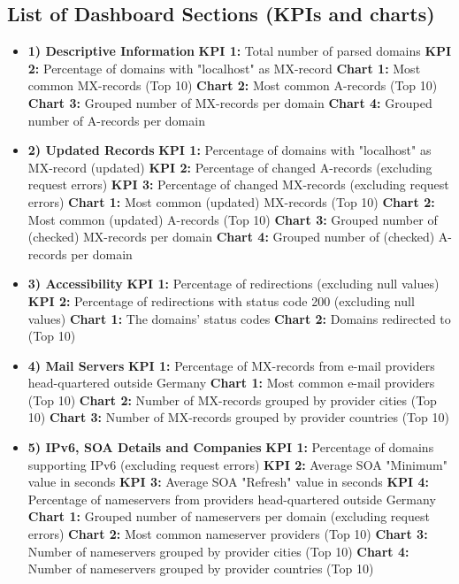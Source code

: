 \subsection{List of Dashboard Sections (KPIs and charts)}\label{subsec:dashboard-sections-(kpis-and-charts)}

\begin{itemize}
    \item \textbf{1) Descriptive Information}
    \subitem \textbf{KPI 1:} Total number of parsed domains
    \subitem \textbf{KPI 2:} Percentage of domains with "localhost" as MX-record
    \subitem \textbf{Chart 1:} Most common MX-records (Top 10)
    \subitem \textbf{Chart 2:} Most common A-records (Top 10)
    \subitem \textbf{Chart 3:} Grouped number of MX-records per domain
    \subitem \textbf{Chart 4:} Grouped number of A-records per domain

    \item \textbf{2) Updated Records}
    \subitem \textbf{KPI 1:} Percentage of domains with "localhost" as MX-record (updated)
    \subitem \textbf{KPI 2:} Percentage of changed A-records (excluding request errors)
    \subitem \textbf{KPI 3:} Percentage of changed MX-records (excluding request errors)
    \subitem \textbf{Chart 1:} Most common (updated) MX-records (Top 10)
    \subitem \textbf{Chart 2:} Most common (updated) A-records (Top 10)
    \subitem \textbf{Chart 3:} Grouped number of (checked) MX-records per domain
    \subitem \textbf{Chart 4:} Grouped number of (checked) A-records per domain

    \item \textbf{3) Accessibility}
    \subitem \textbf{KPI 1:} Percentage of redirections (excluding null values)
    \subitem \textbf{KPI 2:} Percentage of redirections with status code 200 (excluding null values)
    \subitem \textbf{Chart 1:} The domains' status codes
    \subitem \textbf{Chart 2:} Domains redirected to (Top 10)

    \item \textbf{4) Mail Servers}
    \subitem \textbf{KPI 1:} Percentage of MX-records from e-mail providers head-quartered outside Germany
    \subitem \textbf{Chart 1:} Most common e-mail providers (Top 10)
    \subitem \textbf{Chart 2:} Number of MX-records grouped by provider cities (Top 10)
    \subitem \textbf{Chart 3:} Number of MX-records grouped by provider countries (Top 10)

    \item \textbf{5) IPv6, SOA Details and Companies}
    \subitem \textbf{KPI 1:} Percentage of domains supporting IPv6 (excluding request errors)
    \subitem \textbf{KPI 2:} Average SOA "Minimum" value in seconds
    \subitem \textbf{KPI 3:} Average SOA "Refresh" value in seconds
    \subitem \textbf{KPI 4:} Percentage of nameservers from providers head-quartered outside Germany
    \subitem \textbf{Chart 1:} Grouped number of nameservers per domain (excluding request errors)
    \subitem \textbf{Chart 2:} Most common nameserver providers (Top 10)
    \subitem \textbf{Chart 3:} Number of nameservers grouped by provider cities (Top 10)
    \subitem \textbf{Chart 4:} Number of nameservers grouped by provider countries (Top 10)
\end{itemize}

